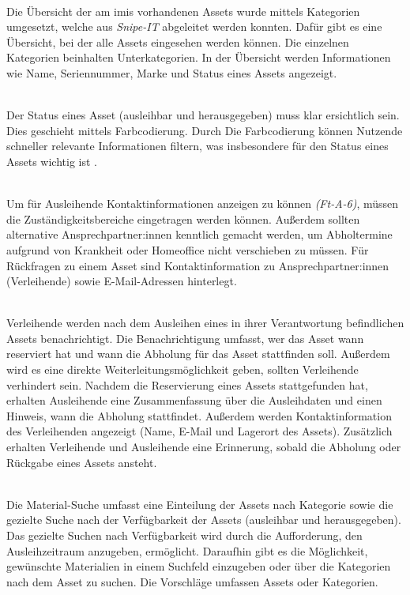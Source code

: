     {\sffamily\color{maincolor}{Ft-VA-2 | Übersicht über ausleihbare Assets }}\\
Die Übersicht der am \ac{imis} vorhandenen Assets wurde mittels Kategorien
umgesetzt, welche aus \textit{Snipe-IT} abgeleitet werden konnten. Dafür gibt es
eine Übersicht, bei der alle Assets eingesehen werden können. Die einzelnen
Kategorien beinhalten Unterkategorien. In der Übersicht werden Informationen wie
Name, Seriennummer, Marke und Status eines Assets angezeigt.

    {\sffamily\color{maincolor}{Ft-VA-3 |  Verfügbarkeit von Assets }}\\
Der Status eines Asset (ausleihbar und herausgegeben) muss klar ersichtlich sein. Dies geschieht
mittels Farbcodierung. Durch Die Farbcodierung können Nutzende schneller relevante Informationen
filtern, was insbesondere für den Status eines Assets wichtig ist \cite{google_material_2022}.


    {\sffamily\color{maincolor}{Ft-VA-4 | Zuständigkeitsbereich }}\\
Um für Ausleihende Kontaktinformationen anzeigen zu können \textit{(Ft-A-6)},
müssen die Zuständigkeitsbereiche eingetragen werden können. Außerdem sollten
alternative Ansprechpartner:innen kenntlich gemacht werden, um Abholtermine
aufgrund von Krankheit oder Homeoffice nicht verschieben zu müssen. Für
Rückfragen zu einem Asset sind Kontaktinformation zu Ansprechpartner:innen
(Verleihende) sowie E-Mail-Adressen hinterlegt.

    {\sffamily\color{maincolor}{Ft-VA-5 | Benachrichtigungen \& Erinnerungen
        }}\\
Verleihende werden nach dem Ausleihen eines in ihrer Verantwortung befindlichen Assets
benachrichtigt. Die Benachrichtigung umfasst, wer das Asset wann reserviert hat und wann die
Abholung für das Asset stattfinden soll. Außerdem wird es eine direkte Weiterleitungsmöglichkeit
geben, sollten Verleihende verhindert sein. Nachdem die Reservierung eines Assets stattgefunden hat,
erhalten Ausleihende eine Zusammenfassung über die Ausleihdaten und einen Hinweis, wann die Abholung
stattfindet. Außerdem werden Kontaktinformation des Verleihenden angezeigt (Name, E-Mail und
Lagerort des Assets). Zusätzlich erhalten Verleihende und Ausleihende eine Erinnerung, sobald die
Abholung oder Rückgabe eines Assets ansteht.

    {\sffamily\color{maincolor}{Ft-VA-6 | Material-Suche }}\\
Die Material-Suche umfasst eine Einteilung der Assets nach Kategorie sowie die gezielte Suche nach
der Verfügbarkeit der Assets (ausleihbar und herausgegeben). Das gezielte Suchen nach Verfügbarkeit
wird durch die Aufforderung, den Ausleihzeitraum anzugeben, ermöglicht. Daraufhin gibt es die
Möglichkeit, gewünschte Materialien in einem Suchfeld einzugeben oder über die Kategorien nach dem
Asset zu suchen. Die Vorschläge umfassen Assets oder Kategorien.

